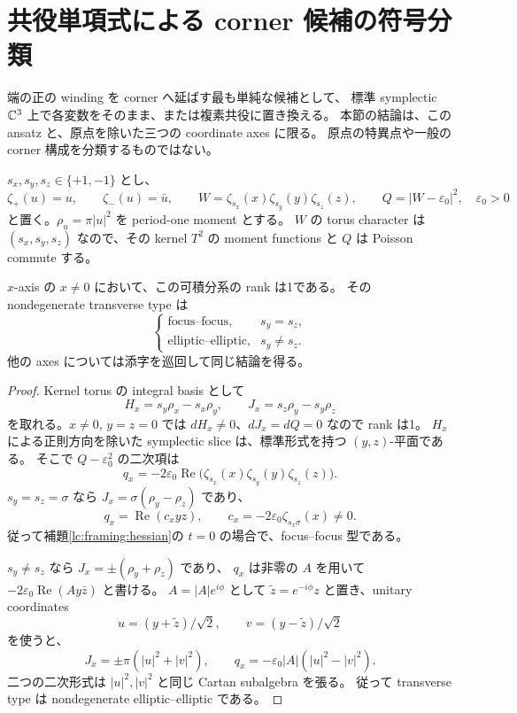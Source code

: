 \section{共役単項式による corner 候補の符号分類}\label{cm:section}

端の正の winding を corner へ延ばす最も単純な候補として、
標準 symplectic $\mathbb C^3$ 上で各変数をそのまま、または複素共役に置き換える。
本節の結論は、この ansatz と、原点を除いた三つの coordinate axes に限る。
原点の特異点や一般の corner 構成を分類するものではない。

$s_x,s_y,s_z\in\{+1,-1\}$ とし、
\[
 \zeta_+(u)=u,\qquad \zeta_-(u)=\bar u,\qquad
 W=\zeta_{s_x}(x)\zeta_{s_y}(y)\zeta_{s_z}(z),\qquad
 Q=|W-\varepsilon_0|^2,\quad\varepsilon_0>0
\]
と置く。$\rho_u=\pi|u|^2$ を period-one moment とする。
$W$ の torus character は $(s_x,s_y,s_z)$ なので、その kernel $T^2$ の moment functions と
$Q$ は Poisson commute する。

\begin{proposition}\label{cm:types}
$x$-axis の $x\ne0$ において、この可積分系の rank は1である。
その nondegenerate transverse type は
\[
 \begin{cases}
 \text{focus--focus},&s_y=s_z,\\
 \text{elliptic--elliptic},&s_y\ne s_z.
 \end{cases}
\]
他の axes については添字を巡回して同じ結論を得る。
\end{proposition}

\begin{proof}
Kernel torus の integral basis として
\[
 H_x=s_y\rho_x-s_x\rho_y,\qquad
 J_x=s_z\rho_y-s_y\rho_z
\]
を取れる。$x\ne0$, $y=z=0$ では $dH_x\ne0$、$dJ_x=dQ=0$ なので rank は1。
$H_x$ による正則方向を除いた symplectic slice は、標準形式を持つ $(y,z)$-平面である。
そこで $Q-\varepsilon_0^2$ の二次項は
\[
 q_x=-2\varepsilon_0
 \operatorname{Re}\bigl(\zeta_{s_x}(x)\zeta_{s_y}(y)\zeta_{s_z}(z)\bigr).
\]
$s_y=s_z=\sigma$ なら $J_x=\sigma(\rho_y-\rho_z)$ であり、
\[
 q_x=\operatorname{Re}(c_x yz),\qquad
 c_x=-2\varepsilon_0\zeta_{s_x\sigma}(x)\ne0.
\]
従って補題\ref{lc:framing:hessian}の $t=0$ の場合で、focus--focus 型である。

$s_y\ne s_z$ なら $J_x=\pm(\rho_y+\rho_z)$ であり、
$q_x$ は非零の $A$ を用いて $-2\varepsilon_0\operatorname{Re}(A y\bar z)$ と書ける。
$A=|A|e^{i\phi}$ として $\widetilde z=e^{-i\phi}z$ と置き、unitary coordinates
\[
 u=(y+\widetilde z)/\sqrt2,\qquad v=(y-\widetilde z)/\sqrt2
\]
を使うと、
\[
 J_x=\pm\pi(|u|^2+|v|^2),\qquad
 q_x=-\varepsilon_0|A|(|u|^2-|v|^2).
\]
二つの二次形式は $|u|^2,|v|^2$ と同じ Cartan subalgebra を張る。
従って transverse type は nondegenerate elliptic--elliptic である。
\end{proof}

